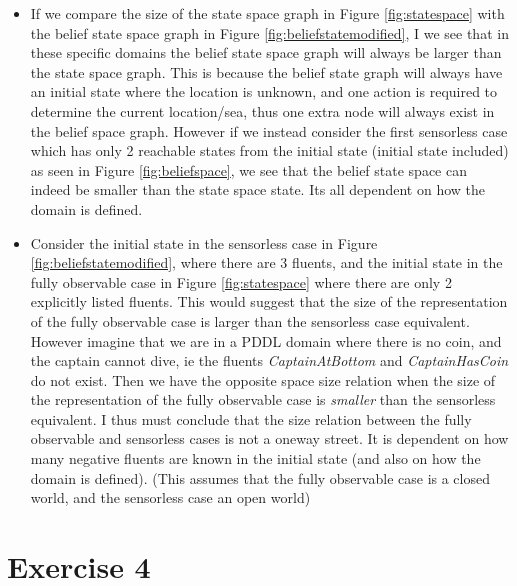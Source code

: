 \documentclass[a4paper, 11pt]{article}
\begin{document}
\begin{itemize}
    \item If we compare the size of the state space graph in Figure \ref{fig:statespace} with the belief state space graph in Figure \ref{fig:beliefstatemodified}, I we see that in these specific domains the belief state space graph will always be larger than the state space graph. This is because the belief state graph will always have an initial state where the location is unknown, and one action is required to determine the current location/sea, thus one extra node will always exist in the belief space graph. However if we instead consider the first sensorless case which has only 2 reachable states from the initial state (initial state included) as seen in Figure \ref{fig:beliefspace}, we see that the belief state space can indeed be smaller than the state space state. Its all dependent on how the domain is defined. 
    \item Consider the initial state in the sensorless case in Figure \ref{fig:beliefstatemodified}, where there are 3 fluents, and the initial state in the fully observable case in Figure \ref{fig:statespace} where there are only 2 explicitly listed fluents. This would suggest that the size of the representation of the fully observable case is larger than the sensorless case equivalent. However imagine that we are in a PDDL domain where there is no coin, and the captain cannot dive, ie the fluents \textit{CaptainAtBottom} and \textit{CaptainHasCoin} do not exist. Then we have the opposite space size relation when the size of the representation of the fully observable case is \textit{smaller} than the sensorless equivalent. I thus must conclude that the size relation between the fully observable and sensorless cases is not a oneway street. It is dependent on how many negative fluents are known in the initial state (and also on how the domain is defined).
    (This assumes that the fully observable case is a closed world, and the sensorless case an open world)
\end{itemize}

\section{Exercise 4}
\end{document}
